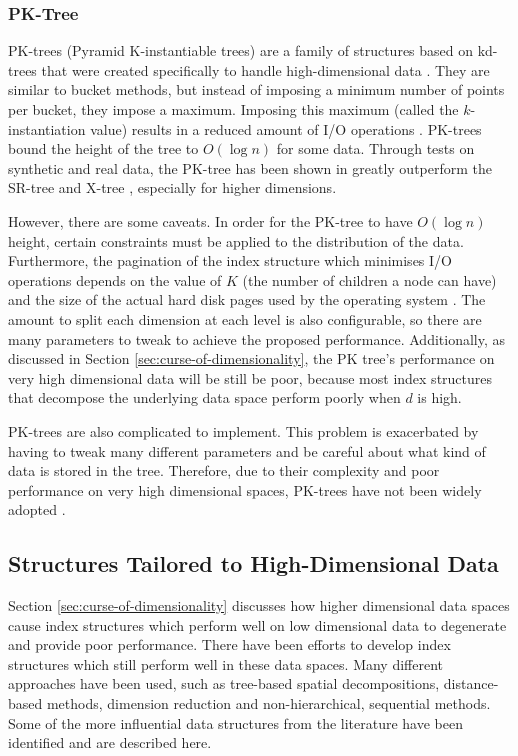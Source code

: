 \subsubsection{PK-Tree}

PK-trees (Pyramid K-instantiable trees) are a family of structures based on kd-trees that were created specifically to handle high-dimensional data \cite{pk-tree}. They are similar to bucket methods, but instead of imposing a minimum number of points per bucket, they impose a maximum. Imposing this maximum (called the $k$-instantiation value) results in a reduced amount of I/O operations \cite{md-structures-samet}. PK-trees bound the height of the tree to $O(\log n)$ for some data. Through tests on synthetic and real data, the PK-tree has been shown in greatly outperform the SR-tree and X-tree \cite{pk-tree}, especially for higher dimensions.

However, there are some caveats. In order for the PK-tree to have $O(\log n)$ height, certain constraints must be applied to the distribution of the data. Furthermore, the pagination of the index structure which minimises I/O operations depends on the value of $K$ (the number of children a node can have) and the size of the actual hard disk pages used by the operating system \cite{pk-tree}. The amount to split each dimension at each level is also configurable, so there are many parameters to tweak to achieve the proposed performance. Additionally, as discussed in Section \ref{sec:curse-of-dimensionality}, the PK tree's performance on very high dimensional data will be still be poor, because most index structures that decompose the underlying data space perform poorly when $d$ is high.

PK-trees are also complicated to implement. This problem is exacerbated by having to tweak many different parameters and be careful about what kind of data is stored in the tree. Therefore, due to their complexity and poor performance on very high dimensional spaces, PK-trees have not been widely adopted \cite{md-structures-samet}.

\subsection{Structures Tailored to High-Dimensional Data}
\label{sec:high-dimensional-structures}

Section \ref{sec:curse-of-dimensionality} discusses how higher dimensional data spaces cause index structures which perform well on low dimensional data to degenerate and provide poor performance. There have been efforts to develop index structures which still perform well in these data spaces. Many different approaches have been used, such as tree-based spatial decompositions, distance-based methods, dimension reduction and non-hierarchical, sequential methods. Some of the more influential data structures from the literature have been identified and are described here.

